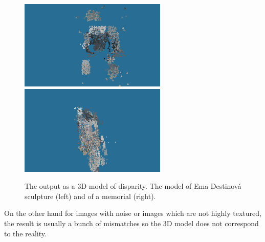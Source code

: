 \begin{figure}[h]
\centerline{
\includegraphics[width=7.0cm]{img/ema_3Dresult.png}
\includegraphics[width=7.0cm]{img/memorial_3Dresult.png}}
\caption{The output as a 3D model of disparity. The model of Ema Destinová sculpture (left) and of a memorial (right).}
\label{fig:outupt_samples}
\end{figure}

On the other hand for images with noise or images which are not highly textured, the result is usually a bunch of mismatches so the 3D model does not correspond to the reality.

